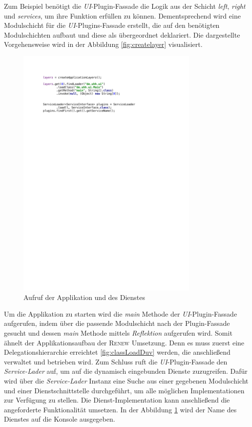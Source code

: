 	Zum Beispiel benötigt die \textit{UI}-Plugin-Fassade die Logik aus der Schicht \textit{left}, \textit{right} und \textit{services}, um ihre Funktion erfüllen zu können. Dementsprechend wird eine Modulschicht für die \textit{UI}-Plugins-Fassade erstellt, die auf den benötigten Modulschichten aufbaut und diese als übergeordnet deklariert. Die dargestellte Vorgehensweise wird in der Abbildung \ref{fig:createlayer} visualisiert.\newpage
	\begin{figure}[h!]
		   \centering
		   \captionsetup{justification=centering}
		   \includegraphics[width=0.8\textwidth]{material/images/umsetzung/main.pdf}
		    \caption{Aufruf der Applikation und des Dienstes}
		   \label{fig:figgi}
	\end{figure}
	Um die Applikation zu starten wird die \textit{main} Methode der \textit{UI}-Plugin-Fassade aufgerufen, indem über die passende Modulschicht nach der Plugin-Fassade gesucht und dessen \textit{main} Methode mittels \textit{Reflektion} aufgerufen wird. Somit ähnelt der Applikationsaufbau der \textsc{Renew} Umsetzung. Denn es muss zuerst eine Delegationshierarchie erreichtet \ref{fig:classLoadDuv} werden, die anschließend verwaltet und betrieben wird. \newline
	Zum Schluss ruft die \textit{UI}-Plugin-Fassade den \textit{Service-Lader} auf, um auf die dynamisch eingebunden Dienste zuzugreifen. Dafür wird über die \textit{Service-Lader} Instanz eine Suche aus einer gegebenen Modulschicht und einer Dienstschnittstelle durchgeführt, um alle möglichen Implementationen zur Verfügung zu stellen. Die Dienst-Implementation kann anschließend die angeforderte Funktionalität umsetzen. In der Abbildung \ref{fig:figgi} wird der Name des Dienstes auf die Konsole ausgegeben. \bigbreak 

